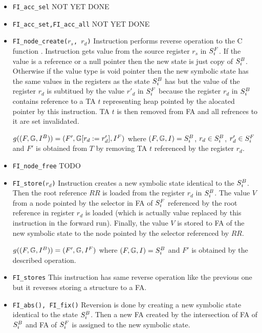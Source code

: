 \begin{itemize}
	\item {\tt FI\_acc\_sel}
		NOT YET DONE

	\item {\tt FI\_acc\_set,FI\_acc\_all}
		NOT YET DONE

	\item {\tt FI\_node\_create($r_s$, $r_d$)}
		Instruction performs reverse operation to the C function .
		Instruction gets value from the source register $r_s$ in $S^{F}_{i}$.
		If the value is a reference or a null pointer then the new
		state is just copy of $S^{B}_{i}$.
		Otherwise if the value type is void pointer then the new symbolic
		state has the same values in the registers as the state $S^{B}_{i}$ has but
		the value of the register $r_d$ is subtitued by the value $r'_{d}$ in $S^{F}_{i}$
		because the register $r_d$ in $S^{B}_{i}$ contains reference to a TA $t$
		representing heap pointed by the alocated pointer by this instruction.
		TA $t$ is then removed from FA and all refrences to it are set invalidated.

		$g((F, \mathbb{G}, I^{B})) = (F', \mathbb{G} [r_{d} := r'_{d}]
			, I^{F})$
			where $(F, \mathbb{G}, I) = S^{B}_{i}$,
			$r_{d} \in S^{B}_{i}$, $r'_{d} \in S^{F}_{i}$
			and $F'$ is obtained from $T$ by removing TA $t$ referenced by the register $r_d$.

	\item {\tt FI\_node\_free}
		TODO

	\item {\tt FI\_store($r_d$)}
		Instruction creates a new symbolic state identical to the $S^{B}_{i}$.
		Then the root reference $RR$ is loaded from the register $r_d$ in $S^{B}_{i}$.
		The value $V$ from a node pointed by the selector in FA of $S^{F}_{i}$ referenced by
		the root reference in register $r_d$ is loaded (which is actually value replaced
		by this instruction in the forward run).
		Finally, the value $V$ is stored to FA of the new symbolic state to the node
		pointed by the selector referenced by $RR$.

		$g((F, \mathbb{G}, I^{B})) = (F', \mathbb{G}, I^{F})$
			where $(F, \mathbb{G}, I) = S^{B}_{i}$ and $F'$ is obtained
			by the described operation.

	
	\item {\tt FI\_stores}
		This instruction has same reverse operation like the previous one but
		it reverses storing a structure to a FA.

	\item {\tt FI\_abs(), FI\_fix()}
		Reversion is done by creating a new symbolic state identical to the state $S^{B}_{i}$.
		Then a new FA created by the intersection of FA of $S^{B}_{i}$ and FA of $S^{F}_{i}$ is assigned
		to the new symbolic state.


\end{itemize}
